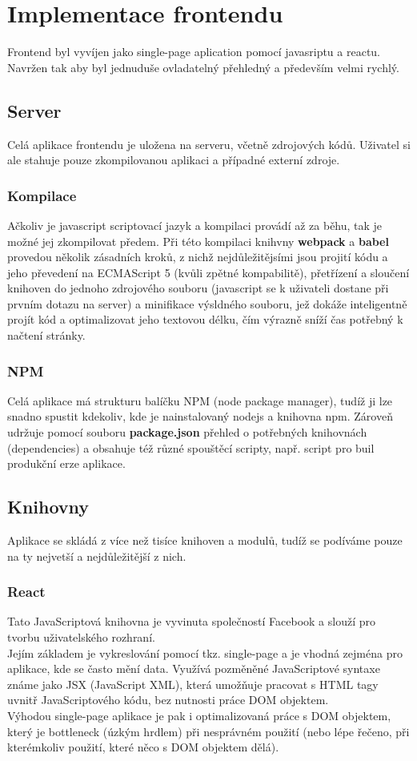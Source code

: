 \chapter{Implementace frontendu}
Frontend byl vyvíjen jako single-page aplication pomocí javasriptu a reactu.
Navržen tak aby byl jednuduše ovladatelný přehledný a především velmi rychlý.

\section{Server}
Celá aplikace frontendu je uložena na serveru, včetně zdrojových kódů.
Uživatel si ale stahuje pouze zkompilovanou aplikaci a případné externí zdroje.
\subsection{Kompilace}
Ačkoliv je javascript scriptovací jazyk a kompilaci provádí až za běhu, tak je možné
jej zkompilovat předem. Při této kompilaci knihvny \textbf{webpack} a
\textbf{babel} provedou několik zásadních kroků, z nichž nejdůležitějsími jsou
projití kódu a jeho převedení na ECMAScript 5 (kvůli zpětné kompabilitě), přetřízení a sloučení
knihoven do jednoho zdrojového souboru (javascript se k uživateli dostane při prvním dotazu na server) a
minifikace výsldného souboru, jež dokáže inteligentně projít kód a optimalizovat jeho textovou délku,
čím výrazně sníží čas potřebný k načtení stránky. 
\subsection{NPM}
Celá aplikace má strukturu balíčku NPM (node package manager), tudíž ji lze snadno
spustit kdekoliv, kde je nainstalovaný nodejs a knihovna npm.
Zároveň udržuje pomocí souboru \textbf{package.json} přehled o potřebných knihovnách (dependencies) a
obsahuje též různé spouštěcí scripty, např. script pro buil produkční erze aplikace.

\section{Knihovny}
Aplikace se skládá z více než tisíce knihoven a modulů, tudíž se podíváme
pouze na ty nejvetší a nejdůležitější z nich.

\subsection{React}
Tato JavaScriptová knihovna je vyvinuta společností Facebook a slouží pro tvorbu uživatelského rozhraní.\\
Jejím základem je vykreslování pomocí tkz. single-page a je vhodná zejména pro aplikace, kde se často mění data.
Využívá pozměněné JavaScriptové syntaxe známe jako JSX (JavaScript XML), která umožňuje
pracovat s HTML tagy uvnitř JavaScriptového kódu, bez nutnosti práce DOM objektem.\\
Výhodou single-page aplikace je pak i optimalizovaná práce s DOM objektem, který je bottleneck
(úzkým hrdlem) při nesprávném použití (nebo lépe řečeno, při kterémkoliv použití, které něco s DOM objektem dělá).

